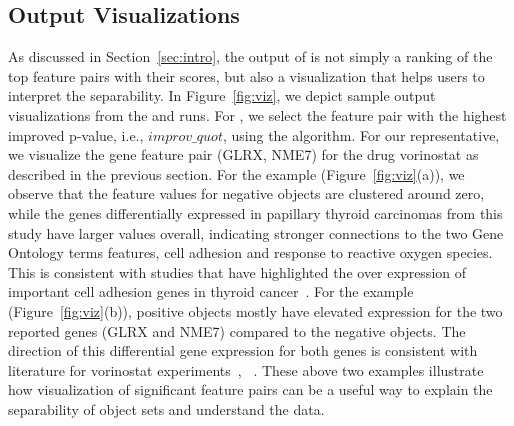 
\subsection{Output Visualizations}\label{ssec:viz}
As discussed in Section~\ref{sec:intro}, the output of \genviz is not simply a ranking of the top feature pairs with their scores, but also a visualization that helps users to interpret the separability. In Figure~\ref{fig:viz}, we depict sample output visualizations from the \msig and \lincs runs. For \msig, we select the feature pair with the highest improved p-value, i.e., $improv\_quot$, using the \sampOpt algorithm. For our \lincs representative, we visualize the gene feature pair (GLRX, NME7) for the drug vorinostat as described in the previous section. 
For the \msig example (Figure~\ref{fig:viz}(a)), we observe that the feature values for negative objects are clustered around zero, while the genes differentially expressed in papillary thyroid carcinomas from this \msig study have larger values overall, indicating stronger connections to the two Gene Ontology terms features, cell adhesion and response to reactive oxygen species. This is consistent with studies that have highlighted the over expression of important cell adhesion genes in thyroid cancer~\cite{gorka2007nrcam}. For the \lincs example (Figure~\ref{fig:viz}(b)), positive objects mostly have elevated expression for the two reported genes (GLRX and NME7) compared to the negative objects. The direction of this differential gene expression for both genes is consistent with literature for vorinostat experiments~\cite{qi2014systematic}, ~\cite{soldi2013genomic}. These above two examples illustrate how visualization of significant feature pairs can be a useful way to explain the separability of object sets and understand the data.
